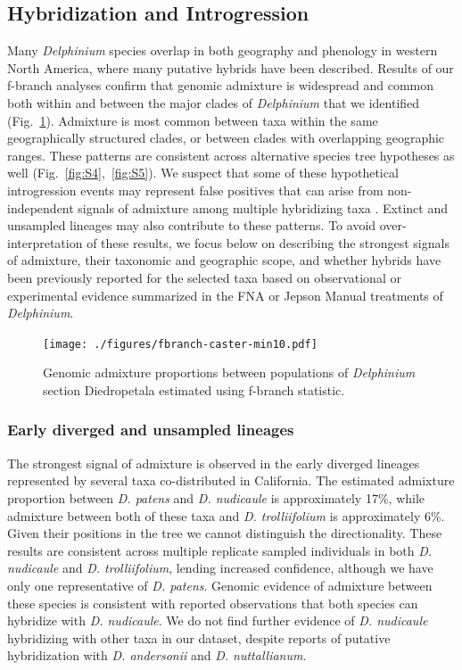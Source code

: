 \documentclass[11pt]{article}
\begin{document}
\subsection{Hybridization and Introgression}
Many \emph{Delphinium} species overlap in both geography and phenology in 
western North America, where many putative hybrids have been described.
% 
Results of our f-branch analyses confirm that genomic admixture is widespread
and common both within and between the major clades of \emph{Delphinium} that
we identified (Fig.~\ref{fig:fbranch}).
Admixture is most common between taxa within the same geographically structured
clades, or between clades with overlapping geographic ranges.
% 
These patterns are consistent across alternative species tree hypotheses as well 
(Fig.~\ref{fig:S4},~\ref{fig:S5}).
% 
We suspect that some of these hypothetical introgression events may
represent false positives that can arise from non-independent signals of
admixture among multiple hybridizing taxa \citep{eaton_historical_2015}.
Extinct and unsampled lineages may also contribute to these patterns.
% 
To avoid over-interpretation of these results, we focus below on describing 
the strongest signals of admixture, their taxonomic and geographic scope, 
and whether hybrids have been previously reported for the selected taxa 
based on observational or experimental evidence summarized in the FNA or 
Jepson Manual treatments of \emph{Delphinium}.

\begin{figure}[t!]
	\centering
	\texttt{[image: ./figures/fbranch-caster-min10.pdf]}
	\caption{
        Genomic admixture proportions between populations of \emph{Delphinium} 
        section Diedropetala estimated using f-branch statistic. 
	}
	\label{fig:fbranch}
\end{figure}

\subsubsection{Early diverged and unsampled lineages}
The strongest signal of admixture is observed in the early diverged lineages 
represented by several taxa co-distributed in California.
The estimated admixture proportion between \emph{D. patens} and 
\emph{D. nudicaule} is approximately 17\%, while admixture between both of 
these taxa and \emph{D. trolliifolium} is approximately 6\%.
Given their positions in the tree we cannot distinguish the directionality.
These results are consistent across multiple replicate sampled individuals
in both \emph{D. nudicaule} and \emph{D. trolliifolium}, lending increased
confidence, although we have only one representative of \emph{D. patens}. 
% 
Genomic evidence of admixture between these species is consistent with 
reported observations that both species can hybridize with \emph{D. nudicaule}.
% 
We do not find further evidence of \emph{D. nudicaule} hybridizing with other
taxa in our dataset, despite reports of putative hybridization with 
\emph{D. andersonii} and \emph{D. nuttallianum}.
% 
\end{document}
